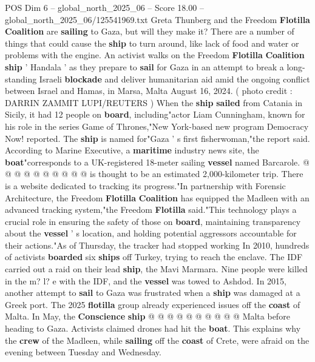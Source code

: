 \begin{textsample}{POS Dim 6 – global\_north\_2025\_06 – Score 18.00 – global\_north\_2025\_06/125541969.txt}  \label{ex:f6_pos_026}
Greta Thunberg and the Freedom \textbf{Flotilla} \textbf{Coalition} are \textbf{sailing} to Gaza, but will they make it?
There are a number of things that could cause the \textbf{ship} to turn around, like lack of food and water or problems with the engine.
An activist walks on the Freedom \textbf{Flotilla} \textbf{Coalition} \textbf{ship} ' Handala ' as they prepare to \textbf{sail} for Gaza in an attempt to break a long-standing Israeli \textbf{blockade} and deliver humanitarian aid amid the ongoing conflict between Israel and Hamas, in Marsa, Malta August 16, 2024. ( photo credit : DARRIN ZAMMIT LUPI/REUTERS ) When the \textbf{ship} \textbf{sailed} from Catania in Sicily, it had 12 people on \textbf{board}, including"actor Liam Cunningham, known for his role in the series Game of Thrones,"New York-based new program Democracy Now! reported.
The \textbf{ship} is named for"Gaza ' s first fisherwoman,"the report said.
According to Marine Executive, a \textbf{maritime} industry news site, the \textbf{boat}"corresponds to a UK-registered 18-meter sailing \textbf{vessel} named Barcarole. @ @ @ @ @ @ @ @ @ @ is thought to be an estimated 2,000-kilometer trip.
There is a website dedicated to tracking its progress."In partnership with Forensic Architecture, the Freedom \textbf{Flotilla} \textbf{Coalition} has equipped the Madleen with an advanced tracking system,"the Freedom \textbf{Flotilla} said."This technology plays a crucial role in ensuring the safety of those on \textbf{board}, maintaining transparency about the \textbf{vessel} ' s location, and holding potential aggressors accountable for their actions."As of Thursday, the tracker had stopped working In 2010, hundreds of activists \textbf{boarded} six \textbf{ships} off Turkey, trying to reach the enclave.
The IDF carried out a raid on their lead \textbf{ship}, the Mavi Marmara.
Nine people were killed in the m? l? e with the IDF, and the \textbf{vessel} was towed to Ashdod.
In 2015, another attempt to \textbf{sail} to Gaza was frustrated when a \textbf{ship} was damaged at a Greek port.
The 2025 \textbf{flotilla} group already experienced issues off the \textbf{coast} of Malta.
In May, the \textbf{Conscience} \textbf{ship} @ @ @ @ @ @ @ @ @ @ Malta before heading to Gaza.
Activists claimed drones had hit the \textbf{boat}.
This explains why the \textbf{crew} of the Madleen, while \textbf{sailing} off the \textbf{coast} of Crete, were afraid on the evening between Tuesday and Wednesday.

\end{textsample}
